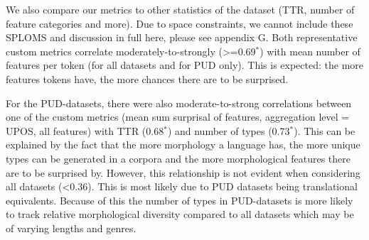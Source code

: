 \documentclass[USenglish]{article}
\begin{document}
We also compare our metrics to other statistics of the dataset (TTR, number of feature categories and more). 
Due to space constraints, we cannot include these SPLOMS and discussion in full here, please see appendix G.
Both representative custom metrics correlate moderately-to-strongly (>=0.69$^*$) with mean number of features per token (for all datasets and for PUD only).
This is expected: the more features tokens have, the more chances there are to be surprised.

For the PUD-datasets, there were also moderate-to-strong correlations between one of the custom metrics (mean sum surprisal of features, aggregation level = UPOS, all features) with TTR (0.68$^*$) and number of types (0.73$^*$).
This can be explained by the fact that the more morphology a language has, the more unique types can be generated in a corpora and the more morphological features there are to be surprised by.
However, this relationship is not evident when considering all datasets (<0.36). 
This is most likely due to PUD datasets being translational equivalents. 
Because of this the number of types in PUD-datasets is more likely to track relative morphological diversity compared to all datasets which may be of varying lengths and genres.
\end{document}
